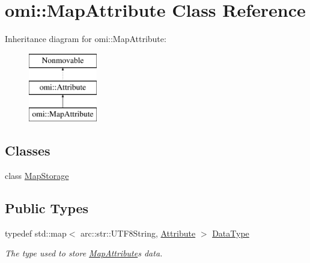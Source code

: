 \hypertarget{classomi_1_1_map_attribute}{}\section{omi\+:\+:Map\+Attribute Class Reference}
\label{classomi_1_1_map_attribute}
Inheritance diagram for omi\+:\+:Map\+Attribute\+:\begin{figure}[H]
\begin{center}
\leavevmode
\includegraphics[height=3.000000cm]{classomi_1_1_map_attribute}
\end{center}
\end{figure}
\subsection*{Classes}
\begin{DoxyCompactItemize}
\item 
class \hyperlink{classomi_1_1_map_attribute_1_1_map_storage}{Map\+Storage}
\end{DoxyCompactItemize}
\subsection*{Public Types}
\begin{DoxyCompactItemize}
\item 
typedef std\+::map$<$ arc\+::str\+::\+U\+T\+F8\+String, \hyperlink{classomi_1_1_attribute}{Attribute} $>$ \hyperlink{classomi_1_1_map_attribute_ac5a11b90e684944a18bcd18376d7eed1}{Data\+Type}\hypertarget{classomi_1_1_map_attribute_ac5a11b90e684944a18bcd18376d7eed1}{}\label{classomi_1_1_map_attribute_ac5a11b90e684944a18bcd18376d7eed1}

\begin{DoxyCompactList}\small\item\em The type used to store \hyperlink{classomi_1_1_map_attribute}{Map\+Attribute}\textquotesingle{}s data. \end{DoxyCompactList}\end{DoxyCompactItemize}
